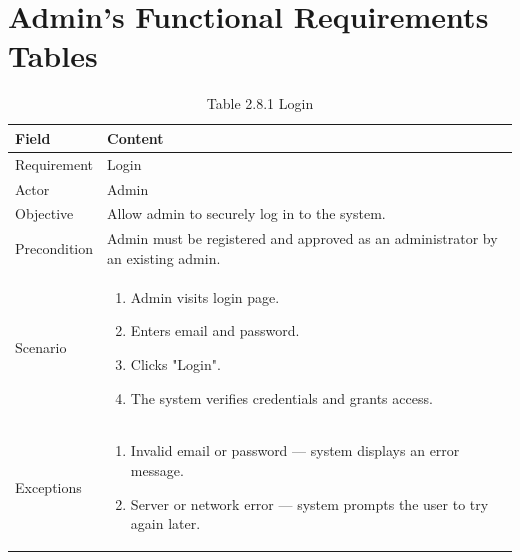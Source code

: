 \documentclass[12pt,oneside]{report}
\begin{document}
\section{Admin’s Functional Requirements Tables}
\begin{table}[H]
\centering
\caption{Table 2.8.1 Login}
\label{tab:admin-login}
\begin{tabularx}{\textwidth}{|p{3cm}|X|}
\hline
\textbf{Field} & \textbf{Content} \\ \hline

Requirement & Login \\ \hline

Actor & Admin \\ \hline

Objective & Allow admin to securely log in to the system. \\ \hline

Precondition & Admin must be registered and approved as an administrator by an existing admin. \\ \hline

Scenario & 
\begin{minipage}[t]{0.75\textwidth}
\begin{enumerate}[leftmargin=*,label=\arabic*.]
\item Admin visits login page.
\item Enters email and password.
\item Clicks "Login".
\item The system verifies credentials and grants access.
\end{enumerate}
\end{minipage} \\ \hline

Exceptions &
\begin{minipage}[t]{0.75\textwidth}
\begin{enumerate}[leftmargin=*,label=\arabic*.]
\item Invalid email or password — system displays an error message.
\item Server or network error — system prompts the user to try again later.
\end{enumerate}
\end{minipage} \\ \hline

\end{tabularx}
\end{table}
\end{document}

